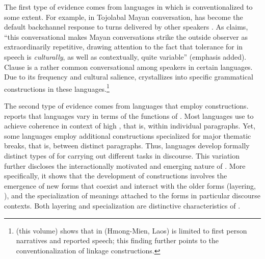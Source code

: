 \documentclass[output=paper]{LSP/langsci}
\begin{document}
The first type of evidence comes from languages in which  is conventionalized to some extent. For example, in Tojolabal Mayan conversation,  has become the default backchannel response to turns delivered by other speakers \citep[][260--261]{brody.1986}. As \citet[][224]{brown.2000} claims, ``this conversational  makes Mayan conversations strike the outside observer as extraordinarily repetitive, drawing attention to the fact that tolerance for  in speech is \textit{culturally}, as well as contextually, quite variable'' (emphasis added). Clause  is a rather common conversational  among speakers in certain languages. Due to its frequency \citep{bybee03} and cultural salience,  crystallizes into specific grammatical constructions in these languages.\footnote{\citeauthor{jarkey18} (this volume) shows that  in  (Hmong-Mien, Laos) is limited to first person narratives and reported speech; this finding further points to the conventionalization of linkage constructions.} 

The second type of evidence comes from languages that employ  constructions. \citet[][112--113]{Guillaume2011} reports that languages vary in terms of the functions of . Most languages use  to achieve coherence in context of high , that is, within individual paragraphs. Yet, some languages employ additional  constructions specialized for major thematic breaks, that is, between distinct paragraphs. Thus, languages develop formally distinct types of  for carrying out different tasks in discourse. This variation further discloses the interactionally motivated and emerging nature of . More specifically, it shows that the development of  constructions involves the emergence of new forms that coexist and interact with the older forms (layering, \citealt{hopper91}), and the specialization of meanings attached to the forms in particular discourse contexts. Both layering and specialization are distinctive characteristics of  \citep{hopper93}. 
\end{document}
